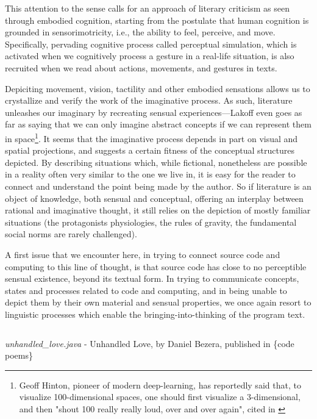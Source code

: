 This attention to the sense calls for an approach of literary criticism as seen through embodied cognition, starting from the postulate that human cognition is grounded in sensorimotricity, i.e., the ability to feel, perceive, and move. Specifically, pervading cognitive process called perceptual simulation, which is activated when we cognitively process a gesture in a real-life situation, is also recruited when we read about actions, movements, and gestures in texts.

Depiciting movement, vision, tactility and other embodied sensations allows us to crystallize and verify the work of the imaginative process. As such, literature unleashes our imaginary by recreating sensual experiences—Lakoff even goes as far as saying that we can only imagine abstract concepts if we can represent them in space\footnote{Geoff Hinton, pioneer of modern deep-learning, has reportedly said that, to visualize 100-dimensional spaces, one should first visualize a 3-dimensional, and then "shout 100 really really loud, over and over again", cited in \citep{akten_journey_2016}}. It seems that the imaginative process depends in part on visual and spatial projections, and suggests a certain fitness of the conceptual structures depicted. By describing situations which, while fictional, nonetheless are possible in a reality often very similar to the one we live in, it is easy for the reader to connect and understand the point being made by the author. So if literature is an object of knowledge, both sensual and conceptual, offering an interplay between rational and imaginative thought, it still relies on the depiction of mostly familiar situations (the protagonists physiologies, the rules of gravity, the fundamental social norms are rarely challenged).

A first issue that we encounter here, in trying to connect source code and computing to this line of thought, is that source code has close to no perceptible sensual existence, beyond its textual form. In trying to communicate concepts, states and processes related to code and computing, and in being unable to depict them by their own material and sensual properties, we once again resort to linguistic processes which enable the bringing-into-thinking of the program text.

\begin{listing}
    \inputminted[]{java}{./corpus/unhandled_love.java}
    \caption{\emph{unhandled\_love.java} - Unhandled Love, by Daniel Bezera, published in \{code poems\} \citep{bertram_code_2012}}
    \label{code:unhandled-love}
\end{listing}


